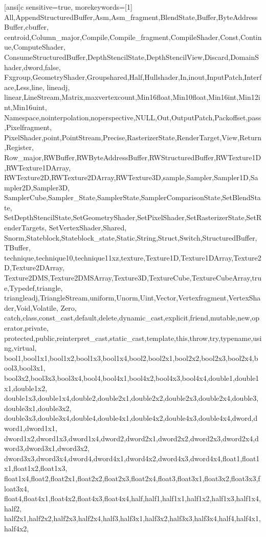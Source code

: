 
[ansi]{c}{%
  sensitive=true,
  morekeywords=[1]{%
    All,AppendStructuredBuffer,Asm,Asm_fragment,BlendState,Buffer,ByteAddressBuffer,cbuffer,
    centroid,Column_major,Compile,Compile_fragment,CompileShader,Const,Continue,ComputeShader,
    ConsumeStructuredBuffer,DepthStencilState,DepthStencilView,Discard,DomainShader,dword,false,
    Fxgroup,GeometryShader,Groupshared,Half,Hullshader,In,inout,InputPatch,Interface,Less,line,
    lineadj,
    linear,LineStream,Matrix,maxvertexcount,Min16float,Min10float,Min16int,Min12int,Min16uint,
    Namespace,nointerpolation,noperspective,NULL,Out,OutputPatch,Packoffset,pass,Pixelfragment,
    PixelShader,point,PointStream,Precise,RasterizerState,RenderTarget,View,Return,Register,
    Row_major,RWBuffer,RWByteAddressBuffer,RWStructuredBuffer,RWTexture1D,RWTexture1DArray,
    RWTexture2D,RWTexture2DArray,RWTexture3D,sample,Sampler,Sampler1D,Sampler2D,Sampler3D,
    SamplerCube,Sampler_State,SamplerState,SamplerComparisonState,SetBlendState,
    SetDepthStencilState,SetGeometryShader,SetPixelShader,SetRasterizerState,SetRenderTargets,
    SetVertexShader,Shared,
    Snorm,Stateblock,Stateblock_state,Static,String,Struct,Switch,StructuredBuffer,TBuffer,
    technique,technique10,technique11xz,texture,Texture1D,Texture1DArray,Texture2D,Texture2DArray,
    Texture2DMS,Texture2DMSArray,Texture3D,TextureCube,TextureCubeArray,true,Typedef,triangle,
    triangleadj,TriangleStream,uniform,Unorm,Uint,Vector,Vertexfragment,VertexShader,Void,Volatile,
    Zero,
    catch,class,const_cast,default,delete,dynamic_cast,explicit,friend,mutable,new,operator,private,
    protected,public,reinterpret_cast,static_cast,template,this,throw,try,typename,using,virtual,
    bool1,bool1x1,bool1x2,bool1x3,bool1x4,bool2,bool2x1,bool2x2,bool2x3,bool2x4,bool3,bool3x1,
    bool3x2,bool3x3,bool3x4,bool4,bool4x1,bool4x2,bool4x3,bool4x4,double1,double1x1,double1x2,
    double1x3,double1x4,double2,double2x1,double2x2,double2x3,double2x4,double3,double3x1,double3x2,
    double3x3,double3x4,double4,double4x1,double4x2,double4x3,double4x4,dword,dword1,dword1x1,
    dword1x2,dword1x3,dword1x4,dword2,dword2x1,dword2x2,dword2x3,dword2x4,dword3,dword3x1,dword3x2,
    dword3x3,dword3x4,dword4,dword4x1,dword4x2,dword4x3,dword4x4,float1,float1x1,float1x2,float1x3,
    float1x4,float2,float2x1,float2x2,float2x3,float2x4,float3,float3x1,float3x2,float3x3,float3x4,
    float4,float4x1,float4x2,float4x3,float4x4,half,half1,half1x1,half1x2,half1x3,half1x4,half2,
    half2x1,half2x2,half2x3,half2x4,half3,half3x1,half3x2,half3x3,half3x4,half4,half4x1,half4x2,
}}

